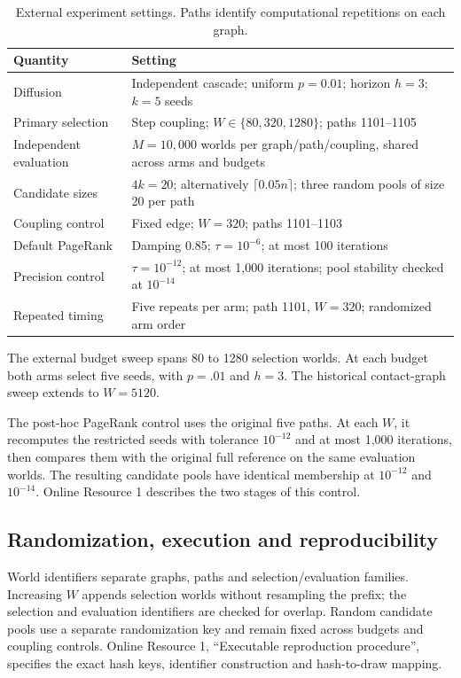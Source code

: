 \documentclass[smallextended]{svjour3}
\begin{document}
\begin{table}[htbp]
\caption{External experiment settings. Paths identify computational repetitions on each graph.}\label{tab:settings}
\begin{tabularx}{\linewidth}{lX}
\toprule
Quantity & Setting \\
\midrule
Diffusion & Independent cascade; uniform $p=0.01$; horizon $h=3$; $k=5$ seeds \\
Primary selection & Step coupling; $W\in\{80,320,1280\}$; paths 1101--1105 \\
Independent evaluation & $M=10,000$ worlds per graph/path/coupling, shared across arms and budgets \\
Candidate sizes & $4k=20$; alternatively $\lceil0.05n\rceil$; three random pools of size 20 per path \\
Coupling control & Fixed edge; $W=320$; paths 1101--1103 \\
Default PageRank & Damping 0.85; $\tau=10^{-6}$; at most 100 iterations \\
Precision control & $\tau=10^{-12}$; at most 1,000 iterations; pool stability checked at $10^{-14}$ \\
Repeated timing & Five repeats per arm; path 1101, $W=320$; randomized arm order \\
\bottomrule
\end{tabularx}
\end{table}

The external budget sweep spans 80 to 1280 selection worlds. At each budget both arms select five seeds, with $p=.01$ and $h=3$. The historical contact-graph sweep extends to $W=5120$.

The post-hoc PageRank control uses the original five paths. At each $W$, it recomputes the restricted seeds with tolerance $10^{-12}$ and at most 1,000 iterations, then compares them with the original full reference on the same evaluation worlds. The resulting candidate pools have identical membership at $10^{-12}$ and $10^{-14}$. Online Resource 1 describes the two stages of this control.

\subsection{Randomization, execution and reproducibility}
World identifiers separate graphs, paths and selection/evaluation families. Increasing $W$ appends selection worlds without resampling the prefix; the selection and evaluation identifiers are checked for overlap. Random candidate pools use a separate randomization key and remain fixed across budgets and coupling controls. Online Resource 1, ``Executable reproduction procedure'', specifies the exact hash keys, identifier construction and hash-to-draw mapping.
\end{document}
